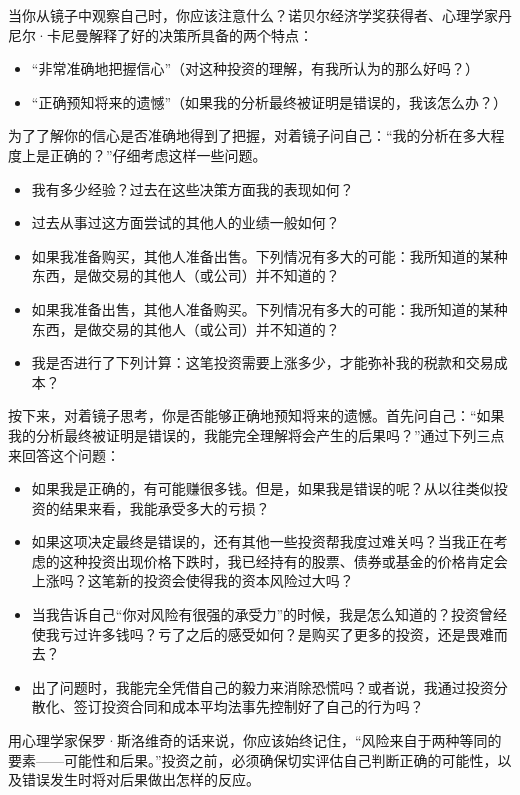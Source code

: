\documentclass[12pt,oneside]{book}
\begin{document}
当你从镜子中观察自己时，你应该注意什么？诺贝尔经济学奖获得者、心理学家丹尼尔·卡尼曼解释了好的决策所具备的两个特点：

\begin{itemize}
\item “非常准确地把握信心”（对这种投资的理解，有我所认为的那么好吗？）
\item “正确预知将来的遗憾”（如果我的分析最终被证明是错误的，我该怎么办？）
\end{itemize}


为了了解你的信心是否准确地得到了把握，对着镜子问自己：“我的分析在多大程度上是正确的？”仔细考虑这样一些问题。

\begin{itemize}
\item 我有多少经验？过去在这些决策方面我的表现如何？
\item 过去从事过这方面尝试的其他人的业绩一般如何？
\item 如果我准备购买，其他人准备出售。下列情况有多大的可能：我所知道的某种东西，是做交易的其他人（或公司）并不知道的？
\item 如果我准备出售，其他人准备购买。下列情况有多大的可能：我所知道的某种东西，是做交易的其他人（或公司）并不知道的？
\item 我是否进行了下列计算：这笔投资需要上涨多少，才能弥补我的税款和交易成本？
\end{itemize}


按下来，对着镜子思考，你是否能够正确地预知将来的遗憾。首先问自己：“如果我的分析最终被证明是错误的，我能完全理解将会产生的后果吗？”通过下列三点来回答这个问题：

\begin{itemize}
\item 如果我是正确的，有可能赚很多钱。但是，如果我是错误的呢？从以往类似投资的结果来看，我能承受多大的亏损？
\item 如果这项决定最终是错误的，还有其他一些投资帮我度过难关吗？当我正在考虑的这种投资出现价格下跌时，我已经持有的股票、债券或基金的价格肯定会上涨吗？这笔新的投资会使得我的资本风险过大吗？
\item 当我告诉自己“你对风险有很强的承受力”的时候，我是怎么知道的？投资曾经使我亏过许多钱吗？亏了之后的感受如何？是购买了更多的投资，还是畏难而去？
\item 出了问题时，我能完全凭借自己的毅力来消除恐慌吗？或者说，我通过投资分散化、签订投资合同和成本平均法事先控制好了自己的行为吗？
\end{itemize}

用心理学家保罗·斯洛维奇的话来说，你应该始终记住，“风险来自于两种等同的要素——可能性和后果。”投资之前，必须确保切实评估自己判断正确的可能性，以及错误发生时将对后果做出怎样的反应。
\end{document}
